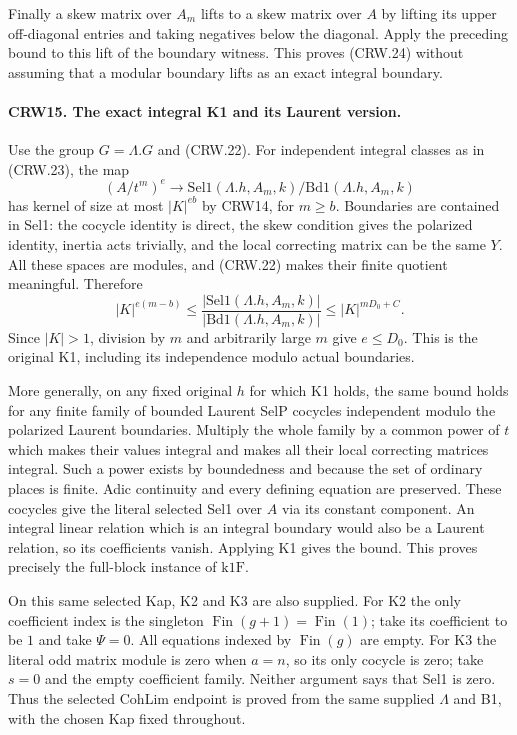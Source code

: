 Finally a skew matrix over $A_m$ lifts to a skew
matrix over $A$ by lifting its upper off-diagonal
entries and taking negatives below the diagonal.
Apply the preceding bound to this lift of the
boundary witness.  This proves (CRW.24) without
assuming that a modular boundary lifts as an exact
integral boundary.

\paragraph{CRW15. The exact integral K1 and its Laurent version.}
\label{claim:CRW15}
Use the group $G=\Lambda.G$ and (CRW.22).
For independent integral classes as in (CRW.23),
the map
\[
 (A/t^m)^e\longrightarrow
 \mathrm{Sel1}(\Lambda.h,A_m,k)\big/
                         \mathrm{Bd1}(\Lambda.h,A_m,k)
\]
has kernel of size at most $|K|^{eb}$ by CRW14,
for $m\ge b$.  Boundaries are contained in Sel1:
the cocycle identity is direct, the skew condition
gives the polarized identity, inertia acts trivially,
and the local correcting matrix can be the same $Y$.
All these spaces are modules, and (CRW.22) makes
their finite quotient meaningful.  Therefore
\[
 |K|^{e(m-b)}
 \leq \frac{|\mathrm{Sel1}(\Lambda.h,A_m,k)|}
               {|\mathrm{Bd1}(\Lambda.h,A_m,k)|}
 \leq |K|^{mD_0+C}.
\]
Since $|K|>1$, division by $m$ and arbitrarily large
$m$ give $e\le D_0$.  This is the original K1,
including its independence modulo actual boundaries.

More generally, on any fixed original $h$ for which
K1 holds, the same bound holds for any finite family
of bounded Laurent SelP cocycles independent modulo
the polarized Laurent boundaries.  Multiply the whole family by a
common power of $t$ which makes their values integral
and makes all their local correcting matrices integral.
Such a power exists by boundedness and because the
set of ordinary places is finite.  Adic continuity
and every defining equation are preserved.
These cocycles give the literal selected Sel1 over
$A$ via its constant component.  An integral
linear relation which is an integral boundary would
also be a Laurent relation, so its coefficients vanish.
Applying K1 gives the bound.  This proves precisely
the full-block instance of $\mathrm{k1F}$.

On this same selected Kap, K2 and K3 are also supplied.
For K2 the only coefficient index is the singleton
$\operatorname{Fin}(g+1)=\operatorname{Fin}(1)$;
take its coefficient to be $1$ and take $\Psi=0$.
All equations indexed by $\operatorname{Fin}(g)$ are
empty.  For K3 the literal odd matrix module is zero
when $a=n$, so its only cocycle is zero; take $s=0$
and the empty coefficient family.  Neither argument
says that Sel1 is zero.
Thus the selected CohLim endpoint is proved from
the same supplied $\Lambda$ and B1, with the chosen
Kap fixed throughout.

